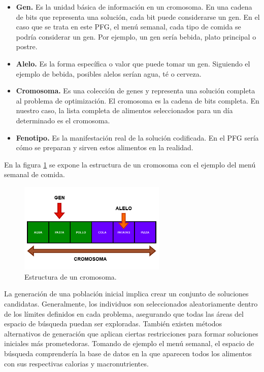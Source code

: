 \begin{itemize}
    \item \textbf{Gen.} Es la unidad básica de información en un cromosoma. En una cadena de bits que representa una solución, cada bit puede considerarse un gen. En el caso que se trata en este PFG, el menú semanal, cada tipo de comida se podría considerar un gen. Por ejemplo, un gen sería bebida, plato principal o postre.
    \item \textbf{Alelo.} Es la forma específica o valor que puede tomar un gen. Siguiendo el ejemplo de bebida, posibles alelos serían agua, té o cerveza.
    \item \textbf{Cromosoma.} Es una colección de genes y representa una solución completa al problema de optimización. El cromosoma es la cadena de bits completa. En nuestro caso, la lista completa de alimentos seleccionados para un día determinado es el cromosoma. 
    \item \textbf{Fenotipo.} Es la manifestación real de la solución codificada. En el PFG sería cómo se preparan y sirven estos alimentos en la realidad.
\end{itemize}

En la figura \ref{fig:cromosoma} se expone la estructura de un cromosoma con el ejemplo del menú semanal de comida.

\begin{figure}[H]
  \centering
  \includegraphics[width=0.625\textwidth]{figures/cromosoma.png}
  \caption{Estructura de un cromosoma.}
  \label{fig:cromosoma}
\end{figure}

La generación de una población inicial implica crear un conjunto de soluciones candidatas. Generalmente, los individuos son seleccionados aleatoriamente dentro de los límites definidos en cada problema, asegurando que todas las áreas del espacio de búsqueda puedan ser exploradas. También existen métodos alternativos de generación que aplican ciertas restricciones para formar soluciones iniciales más prometedoras. Tomando de ejemplo el menú semanal, el espacio de búsqueda comprendería la base de datos en la que aparecen todos los alimentos con sus respectivas calorias y macronutrientes. 

